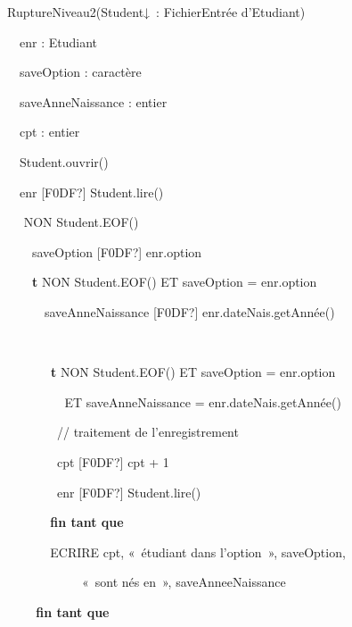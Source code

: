 {\sffamily
{} RuptureNiveau2(Student↓~: FichierEntrée
d’Etudiant)}

{\sffamily
{}}

{\sffamily
{}}

{\sffamily
\ \ enr : Etudiant}

{\sffamily
\ \ saveOption : caractère}

{\sffamily
\ \ saveAnneNaissance : entier}

{\sffamily
\ \ cpt : entier}

{\sffamily
\ \ Student.ouvrir()}

{\sffamily
\ \ enr \textrm{[F0DF?]} Student.lire()}

{\sffamily
\ \   NON Student.EOF()
\ \ }

{\sffamily
\ \ \ \ saveOption \textrm{[F0DF?]} enr.option\ \ \ \ }

{\sffamily
\ \ \ \ \textbf{t}  NON
Student.EOF() ET saveOption = enr.option }

{\sffamily
\ \ \ \ \ \ saveAnneNaissance \textrm{[F0DF?]} enr.dateNais.getAnnée()}

{\sffamily
{}\textstyleMotCl{\textrm{\textmd{[F0DF?]}}}\textbf{\ \ }}

{\sffamily
\ \ \ \ \ \ \ \textbf{t}  NON
Student.EOF() ET saveOption = enr.option }

{\sffamily
\textbf{\ \ \ \ \ \ \ \ }ET saveAnneNaissance =
enr.dateNais.getAnnée()}

{\sffamily
\ \ \ \ \ \ \ \ // traitement de l’enregistrement}

{\sffamily
\ \ \ \ \ \ \ \ cpt \textrm{[F0DF?]} cpt + 1}

{\sffamily
\ \ \ \ \ \ \ \ enr \textrm{[F0DF?]} Student.lire()}

{\sffamily\bfseries
\ \ \ \ \ \ fin tant que}

{\sffamily
\textbf{\ \ \ \ \ \ }ECRIRE cpt, «~étudiant dans l’option~», saveOption,
}

{\sffamily
\ \ \ \ \ \ \ \ \ \ \ \ «~sont nés en~», saveAnneeNaissance\ \ }

{\sffamily\bfseries
\ \ \ \ fin tant que}

